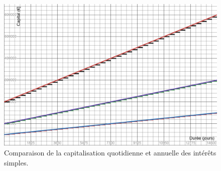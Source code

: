 \documentclass{article}
\begin{document}
\begin{enumerate}[label=\textbf{R1.\arabic*}]
	      \begin{figure}[h!]
	      	\centering
	      	\includegraphics[width=\textwidth]{interets_simples.png}
	      	\caption{Comparaison de la capitalisation quotidienne et annuelle des intérêts simples.}
	      	\label{fig:interets_simples}
	      \end{figure}
	      

\end{enumerate}
\end{document}
